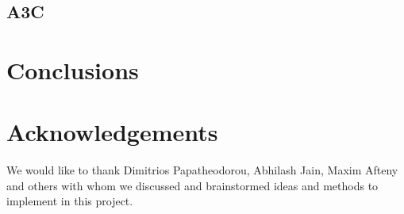 \documentclass{article}
\begin{document}
\subsection{A3C}


\section{Conclusions}
\label{sec:conclusion}

\section{Acknowledgements}
We would like to thank Dimitrios Papatheodorou, Abhilash Jain, Maxim Afteny and others with whom we discussed and brainstormed ideas and methods to implement in this project.
\clearpage      
{}

\end{document}
